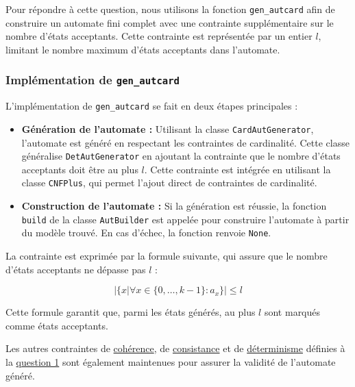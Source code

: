 \label{question 6}

Pour répondre à cette question, nous utilisons la fonction \texttt{gen\_autcard} afin de construire un automate fini complet avec une contrainte supplémentaire sur le nombre d'états acceptants. Cette contrainte est représentée par un entier \( l \), limitant le nombre maximum d'états acceptants dans l'automate.

\subsubsection*{Implémentation de \texttt{gen\_autcard}}

L'implémentation de \texttt{gen\_autcard} se fait en deux étapes principales :

\begin{itemize}
    \item \textbf{Génération de l'automate :} Utilisant la classe \texttt{CardAutGenerator}, l'automate est généré en respectant les contraintes de cardinalité. Cette classe généralise \texttt{DetAutGenerator} en ajoutant la contrainte que le nombre d'états acceptants doit être au plus \( l \). Cette contrainte est intégrée en utilisant la classe \texttt{CNFPlus}, qui permet l'ajout direct de contraintes de cardinalité.\\

    \item \textbf{Construction de l'automate :} Si la génération est réussie, la fonction \texttt{build} de la classe \texttt{AutBuilder} est appelée pour construire l'automate à partir du modèle trouvé. En cas d'échec, la fonction renvoie \texttt{None}.
\end{itemize}

\vspace{0.5cm}

{}

\begin{tcolorbox}[defaultstyle,title=Contrainte de Cardinalité]
La contrainte est exprimée par la formule suivante, qui assure que le nombre d'états acceptants ne dépasse pas \( l \) :

\[ \big\lvert \{ x \vert \forall x \in \{0,\dots,k-1\} : a_x \} \big\rvert \leq l \]


Cette formule garantit que, parmi les états générés, au plus \( l \) sont marqués comme états acceptants.
\end{tcolorbox}

\vspace{0.5cm}
Les autres contraintes de \hyperref[cohérence]{cohérence}, de \hyperref[consistance]{consistance} et de \hyperref[determinisme]{déterminisme} définies à la \hyperref[question 1]{question 1} sont également maintenues pour assurer la validité de l'automate généré.


